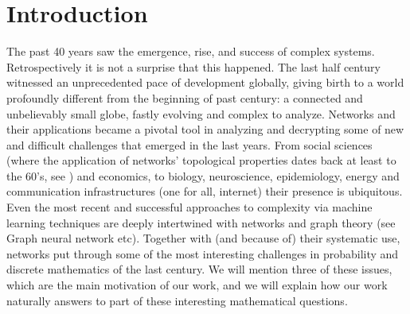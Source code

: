 \documentclass[12pt,twoside,a4paper]{article}
\begin{document}
\section{Introduction}
The past 40 years saw the emergence, rise, and success of complex systems. Retrospectively it is not a surprise that this happened. The last half century witnessed an unprecedented pace of development globally, giving birth to a world profoundly different from the beginning of past century: a connected and unbelievably small globe, fastly evolving and complex to analyze. Networks and their applications became a pivotal tool in analyzing and decrypting some  of new and difficult challenges that emerged in the last years. From social sciences (where the application of networks' topological properties dates back at least to the 60's, see \cite{milgram1967small}) and economics, to biology, neuroscience, epidemiology, energy and communication infrastructures (one for all, internet) their presence is ubiquitous. Even the most recent and successful approaches to complexity via machine learning techniques are deeply intertwined with networks and graph theory (see Graph neural network etc). Together with (and because of) their systematic use, networks put through some of the most interesting challenges in probability and discrete mathematics of the last century. We will mention three of these issues, which are the main motivation of our work, and we will explain how our work naturally answers to part of these interesting mathematical questions.
\end{document}
